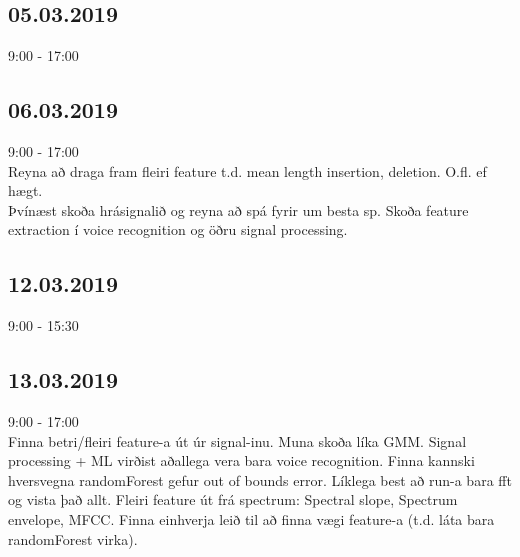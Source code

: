 \documentclass{article}
\begin{document}
\subsection*{05.03.2019}
9:00 - 17:00 \\

\subsection*{06.03.2019}
9:00 - 17:00 \\
Reyna að draga fram fleiri feature t.d. mean length insertion, deletion. O.fl. ef hægt.
\\
Þvínæst skoða hrásignalið og reyna að spá fyrir um besta sp. Skoða feature extraction í voice recognition og öðru signal processing.

\subsection*{12.03.2019}
9:00 - 15:30 \\


\subsection*{13.03.2019}
9:00 - 17:00 \\
Finna betri/fleiri feature-a út úr signal-inu. Muna skoða líka GMM. Signal processing + ML virðist aðallega vera bara voice recognition. Finna kannski hversvegna randomForest gefur out of bounds error. Líklega best að run-a bara fft og vista það allt. Fleiri feature út frá spectrum: Spectral slope, Spectrum envelope, MFCC. Finna einhverja leið til að finna vægi feature-a (t.d. láta bara randomForest virka).
\end{document}
